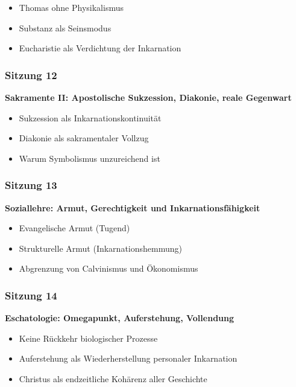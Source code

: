 \documentclass[
]{article}
\begin{document}
\begin{itemize}
\item
  Thomas ohne Physikalismus
\item
  Substanz als Seinsmodus
\item
  Eucharistie als Verdichtung der Inkarnation
\end{itemize}

\subsubsection{\texorpdfstring{\textbf{Sitzung 12}}{Sitzung 12}}\label{sitzung-12}

\textbf{Sakramente II: Apostolische Sukzession, Diakonie, reale Gegenwart}

\begin{itemize}
\item
  Sukzession als Inkarnationskontinuität
\item
  Diakonie als sakramentaler Vollzug
\item
  Warum Symbolismus unzureichend ist
\end{itemize}

\subsubsection{\texorpdfstring{\textbf{Sitzung 13}}{Sitzung 13}}\label{sitzung-13}

\textbf{Soziallehre: Armut, Gerechtigkeit und Inkarnationsfähigkeit}

\begin{itemize}
\item
  Evangelische Armut (Tugend)
\item
  Strukturelle Armut (Inkarnationshemmung)
\item
  Abgrenzung von Calvinismus und Ökonomismus
\end{itemize}

\subsubsection{\texorpdfstring{\textbf{Sitzung 14}}{Sitzung 14}}\label{sitzung-14}

\textbf{Eschatologie: Omegapunkt, Auferstehung, Vollendung}

\begin{itemize}
\item
  Keine Rückkehr biologischer Prozesse
\item
  Auferstehung als Wiederherstellung personaler Inkarnation
\item
  Christus als endzeitliche Kohärenz aller Geschichte
\end{itemize}
\end{document}

